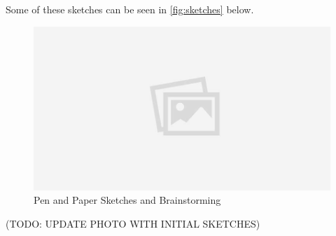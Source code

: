 \documentclass[12pt]{article}
\begin{document}
	Some of these sketches can be seen in \autoref{fig:sketches} below.
	\begin{figure}[H]
		\centering
		\includegraphics[scale=0.3]{images/placeholder.jpg}
		\caption{Pen and Paper Sketches and Brainstorming}
		\label{fig:sketches}
	\end{figure}
	(TODO: UPDATE PHOTO WITH INITIAL SKETCHES)
	
\end{document}
